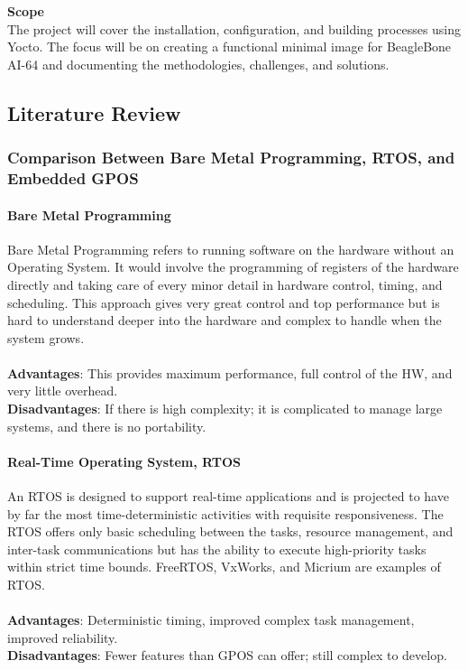 \noindent
\textbf{Scope}\\
The project will cover the installation, configuration, and building processes using Yocto. The focus will be on creating a functional minimal image for BeagleBone AI-64 and documenting the methodologies, challenges, and solutions. 



\subsection{Literature Review}

\subsubsection{Comparison Between Bare Metal Programming, RTOS, and Embedded GPOS} 

\paragraph{\textbf{Bare Metal Programming}}
Bare Metal Programming refers to running software on the hardware without an Operating System. It would involve the programming of registers of the hardware directly and taking care of every minor detail in hardware control, timing, and scheduling. This approach gives very great control and top performance but is hard to understand deeper into the hardware and complex to handle when the system grows.\\\\
\noindent
\textbf{Advantages}: This provides maximum performance, full control of the HW, and very little overhead. \\
\textbf{Disadvantages}: If there is high complexity; it is complicated to manage large systems, and there is no portability.\\

\paragraph{\textbf{Real-Time Operating System, RTOS}}
An RTOS is designed to support real-time applications and is projected to have by far the most time-deterministic activities with requisite responsiveness. The RTOS offers only basic scheduling between the tasks, resource management, and inter-task communications but has the ability to execute high-priority tasks within strict time bounds. 
FreeRTOS, VxWorks, and Micrium are examples of RTOS.\\ \\
\noindent 
\textbf{Advantages}: Deterministic timing, improved complex task management, improved reliability.\\
\textbf{Disadvantages}: Fewer features than GPOS can offer; still complex to develop.\\

